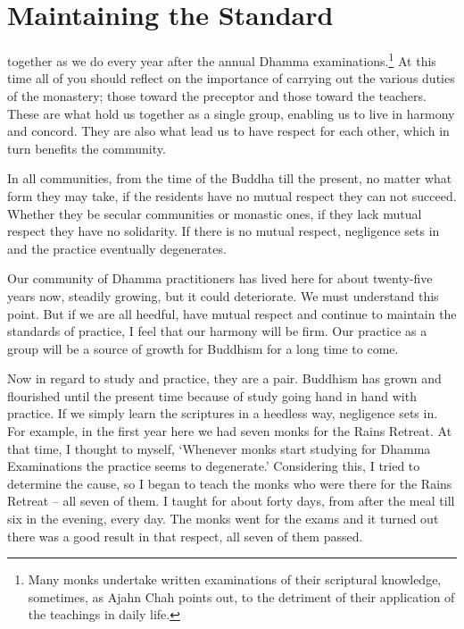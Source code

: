 
\chapter{Maintaining the Standard}

 together as we do every year after the annual Dhamma examinations.\footnote{Many monks undertake written examinations of their scriptural knowledge, sometimes, as Ajahn Chah points out, to the detriment of their application of the teachings in daily life.} At this time all of you should reflect on the importance of carrying out the various duties of the monastery; those toward the preceptor and those toward the teachers. These are what hold us together as a single group, enabling us to live in harmony and concord. They are also what lead us to have respect for each other, which in turn benefits the community. 

In all communities, from the time of the Buddha till the present, no matter what form they may take, if the residents have no mutual respect they can not succeed. Whether they be secular communities or monastic ones, if they lack mutual respect they have no solidarity. If there is no mutual respect, negligence sets in and the practice eventually degenerates. 

Our community of Dhamma practitioners has lived here for about twenty-five years now, steadily growing, but it could deteriorate. We must understand this point. But if we are all heedful, have mutual respect and continue to maintain the standards of practice, I feel that our harmony will be firm. Our practice as a group will be a source of growth for Buddhism for a long time to come. 

Now in regard to study and practice, they are a pair. Buddhism has grown and flourished until the present time because of study going hand in hand with practice. If we simply learn the scriptures in a heedless way, negligence sets in.
 For example, in the first year here we had seven monks for the Rains Retreat. At that time, I thought to myself, `Whenever monks start studying for Dhamma Examinations the practice seems to degenerate.' Considering this, I tried to determine the cause, so I began to teach the monks who were there for the Rains Retreat -- all seven of them. I taught for about forty days, from after the meal till six in the evening, every day. The monks went for the exams and it turned out there was a good result in that respect, all seven of them passed. 

